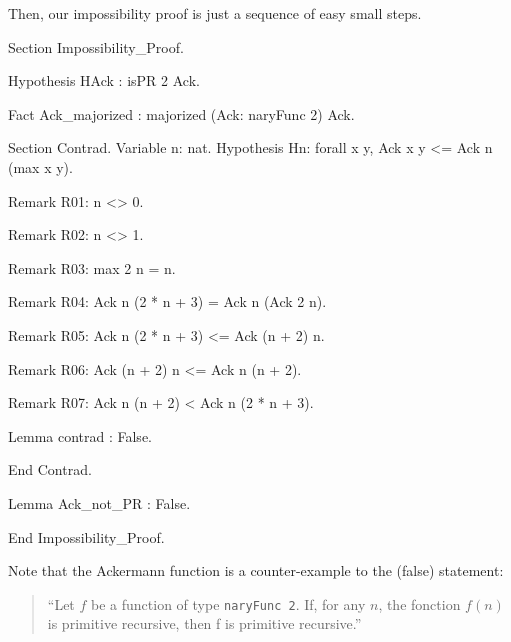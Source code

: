 Then, our impossibility proof is just a sequence of easy small steps.

\begin{Coqsrc}
Section Impossibility_Proof.

  Hypothesis HAck : isPR 2 Ack.

  Fact Ack_majorized : majorized (Ack: naryFunc 2)  Ack.
  
  Section Contrad.
    Variable n: nat.
    Hypothesis  Hn: forall x y,  Ack x y <= Ack n (max x  y).

    Remark R01: n <> 0.
  
    Remark R02: n <> 1.
   
    Remark R03: max 2 n = n.
   
    Remark R04: Ack n (2 * n + 3) = Ack n (Ack 2 n).
       
    Remark R05: Ack n (2 * n + 3) <= Ack (n + 2) n.
   
    Remark R06: Ack (n + 2) n <= Ack n (n + 2).
   
    Remark R07: Ack n (n + 2) < Ack n (2 * n + 3).
   
    Lemma contrad : False.
   
  End Contrad.

  Lemma Ack_not_PR : False.

End Impossibility_Proof.
\end{Coqsrc}









      


\begin{remark}
Note that the Ackermann function is a counter-example to the (false) statement:
\begin{quote}
{\color{red}
  ``Let $f$ be a function of type \texttt{naryFunc\,2}. If, for any $n$, the fonction $f(n)$ is primitive recursive, then f is primitive recursive.''}
\end{quote}
\end{remark}




